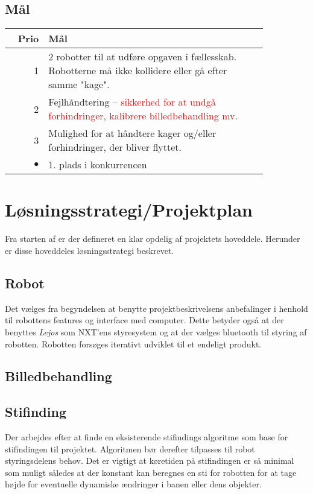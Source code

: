 \subsection{Mål}
\begin{tabular}{r p{0.85\linewidth}}
	\textbf{Prio} & \textbf{Mål} \\
	\hline
	1 & 2 robotter til at udføre opgaven i fællesskab. Robotterne må ikke kollidere eller gå efter samme "kage".\\
	2 & Fejlhåndtering -- \textcolor{red}{sikkerhed for at undgå forhindringer, kalibrere billedbehandling mv.}\\
	3 & Mulighed for at håndtere kager og/eller forhindringer, der bliver flyttet. \\
	$\bullet$ & 1. plads i konkurrencen
\end{tabular}

\section{Løsningsstrategi/Projektplan}
Fra starten af er der defineret en klar opdelig af projektets hoveddele. Herunder er disse hoveddeles løsningsstrategi beskrevet.

\subsection{Robot}
Det vælges fra begyndelsen at benytte projektbeskrivelsens anbefalinger i henhold til robottens features og interface med computer.
Dette betyder også at der benyttes \textit{Lejos} som NXT'ens styresystem og at der vælges bluetooth til styring af robotten.
Robotten forsøges iterativt udviklet til et endeligt produkt.

\subsection{Billedbehandling}

\subsection{Stifinding}
Der arbejdes efter at finde en eksisterende stifindings algoritme som base for stifindingen til projektet. Algoritmen bør derefter tilpasses til robot styringsdelens behov.
Det er vigtigt at køretiden på stifindingen er så minimal som muligt således at der konstant kan beregnes en sti for robotten for at tage højde for eventuelle dynamiske ændringer i banen eller dens objekter.